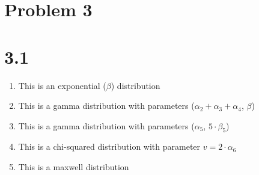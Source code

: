 \documentclass{article}
\begin{document}
\section*{Problem 3}
\section*{3.1}
\begin{enumerate}
\item This is an exponential ($\beta$) distribution \\
\item This is a gamma distribution with parameters ($\alpha_2 + \alpha_3 + \alpha_4$, $\beta$)\\
\item This is a gamma distribution with parameters ($\alpha_5$, $5 \cdot \beta_5$) \\
\item This is a chi-squared distribution with parameter $v = 2 \cdot \alpha_6$ \\
\item This is a maxwell distribution \\
\end{enumerate}
\end{document}
